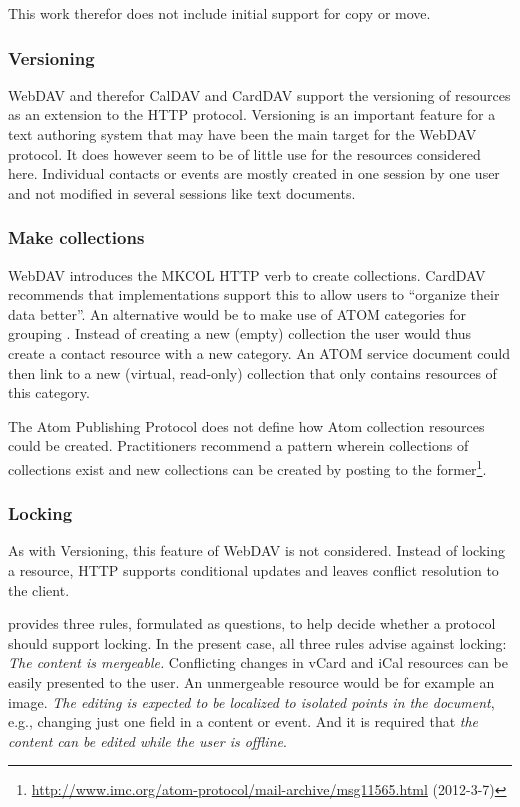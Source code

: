 \documentclass[11pt,a4paper,headsepline,twoside]{scrartcl}		%
\newcommand{\citeurl}[2]{\url{#1} (#2)}
\begin{document}
This work therefor does not include initial support for copy or move.

\subsubsection{Versioning}

WebDAV and therefor CalDAV and CardDAV support the versioning of resources as an
extension to the HTTP protocol. Versioning is an important feature for a text
authoring system that may have been the main target for the WebDAV protocol.  It
does however seem to be of little use for the resources considered
here. Individual contacts or events are mostly created in one session by one
user and not modified in several sessions like text documents.

\subsubsection{Make collections}

WebDAV introduces the MKCOL HTTP verb to create collections. CardDAV recommends
that implementations support this to allow users to ``organize their data
better''. An alternative would be to make use of ATOM categories for
grouping \cite{RFC5023}. Instead of creating a new (empty) collection the user
would thus create a contact resource with a new category. An ATOM service
document could then link to a new (virtual, read-only) collection that only
contains resources of this category.

The Atom Publishing Protocol does not define how Atom collection resources could
be created. Practitioners recommend a pattern wherein collections of collections
exist and new collections can be created by posting to the
former\footnote{\citeurl{http://www.imc.org/atom-protocol/mail-archive/msg11565.html}{2012-3-7}}.

\subsubsection{Locking}
\label{sec:locking}

As with Versioning, this feature of WebDAV is not considered. Instead of locking
a resource, HTTP supports conditional updates and leaves conflict resolution to
the client.

\cite[sec. 1]{Nielsen1999} provides three rules, formulated as questions, to
help decide whether a protocol should support locking. In the present case,
all three rules advise against locking: \textit{The content is mergeable.}
Conflicting changes in vCard and iCal resources can be easily presented to the
user. An unmergeable resource would be for example an image. \textit{The editing
  is expected to be localized to isolated points in the document}, e.g.,
changing just one field in a content or event. And it is required that
\textit{the content can be edited while the user is offline}.
\end{document}
